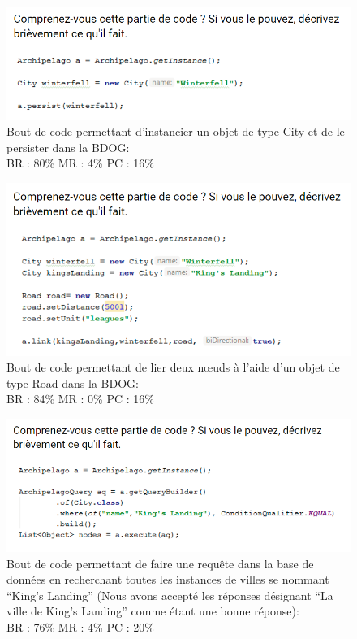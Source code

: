 \documentclass[a4paper,fleqn,12pt,oneside]{book}
\begin{document}
\newpage
{}
\begin{figure}[!ht]
\centering
\includegraphics[scale=0.9]{figures/Snippet1.png}
\caption{Bout de code permettant d'instancier un objet de type City et de le persister dans la BDOG:\\BR : 80\% MR : 4\% PC : 16\% }
\label{fig:Snippet1}
\end{figure}

\begin{figure}[!ht]
\centering
\includegraphics[scale=0.9]{figures/Snippet2.png}
\caption{Bout de code permettant de lier deux nœuds à l'aide d'un objet de type Road dans la BDOG:\\BR : 84\% MR : 0\% PC : 16\% }
\label{fig:Snippet2}
\end{figure}

\newpage

\begin{figure}[!ht]
\centering
\includegraphics[scale=0.9]{figures/Snippet3.png}
\caption{Bout de code permettant de faire une requête dans la base de données en recherchant toutes les instances de villes se nommant \enquote{King's Landing} (Nous avons accepté les réponses désignant \enquote{La ville de King's Landing} comme étant une bonne réponse):\\BR : 76\% MR : 4\% PC : 20\% }
\label{fig:Snippet3}
\end{figure}
\end{document}
